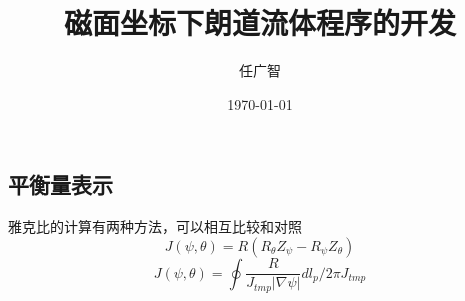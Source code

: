 \documentclass[11pt,a4paper]{article}
\title{磁面坐标下朗道流体程序的开发}
\author{任广智}
\date{\today}
\begin{document}
	
\maketitle
	
%
%
%
%
%
%
\subsection{平衡量表示}
雅克比的计算有两种方法，可以相互比较和对照 
$$J(\psi,\theta) = R(R_\theta Z_\psi-R_\psi Z_\theta)$$ $$J(\psi,\theta) = \oint\frac{R}{J_{tmp}|\nabla\psi|}dl_p/{2\pi} J_{tmp}$$
\end{document}
